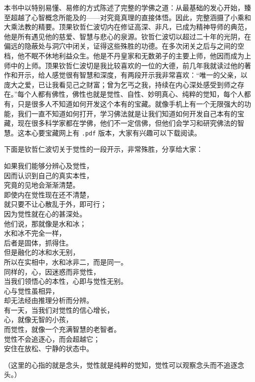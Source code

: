 \begin{book}
    本书中以特别易懂、易修的方式陈述了完整的学佛之道：从最基础的发心开始，臻至超越了心智概念所能及的——对究竟真理的直接体悟。因此，完整涵摄了小乘和大乘法教的精要。顶果钦哲仁波切内在修证高深、非凡，已成为精神导师的典范，他是所有遇见他的慈爱、智慧与悲心的泉源。钦哲仁波切以超过二十年的光阴，在偏远的隐蔽处与洞穴中闭关，证得这些殊胜的功德。在多次闭关之后与之间的空档，他不眠不休地利益众生。他是不丹皇家和无数弟子的主要上师，他因而成为上师中的上师。顶果钦哲仁波切是我比较喜欢的一位的大德，前几年我就读过他的著作和开示，给人感觉很有智慧和深度，有两段开示我非常喜欢：“唯一的父亲，以庞大之爱，已让我看见己之财富；曾为乞丐之我，持续在内心深处感受到师之存在。”每个人都有佛性，佛性也就是觉性、自性、妙明真心、纯粹的觉知，每个人都有，只是很多人不知道如何开发这个本有的宝藏。就像手机上有一个无限强大的功能，我们一直不知道如何打开，学习佛法就是让我们知道如何开发自己本有的宝藏，现在很多科学家都在学佛，他们不一定信佛，但他们会学习和研究佛法的智慧。这本心要宝藏网上有 \texttt{.pdf} 版本，大家有兴趣可以下载阅读。

    下面是钦哲仁波切关于觉性的一段开示，非常殊胜，分享给大家：

    \begin{multicols}{2}
        \centering
        如果我们能够分辨心及觉性， \\ 因而认识到自己的真实本性， \\ 究竟的见地会渐渐清楚。 \\ 即使内在觉性现在还不清楚， \\ 就只要不让心散乱于外，即可行； \\ 因为觉性就在心的甚深处。 \\ 他们说，那就像是水和冰； \\ 水和冰不完全一样， \\ 后者是固体，抓得住。 \\ 但是融化的冰和水无别， \\ 所以在实相中，水和冰非二，而是同一。 \\ 同样的，心，因迷惑而非觉性， \\ 当我们领悟心的本性，心即与觉性无别。 \\ 心与觉性虽相异， \\ 却无法经由推理分析而分辨。 \\ 有一天，当我们对觉性的信心增长， \\ 心，就像无智的小孩， \\ 而觉性，就像一个充满智慧的老智者。 \\ 觉性不会追逐心，而会超越它； \\ 安住在放松、宁静的状态中。
    \end{multicols}

    （这里的心指的就是念头，觉性就是纯粹的觉知，觉性可以观察念头而不追逐念头。）
\end{book}
